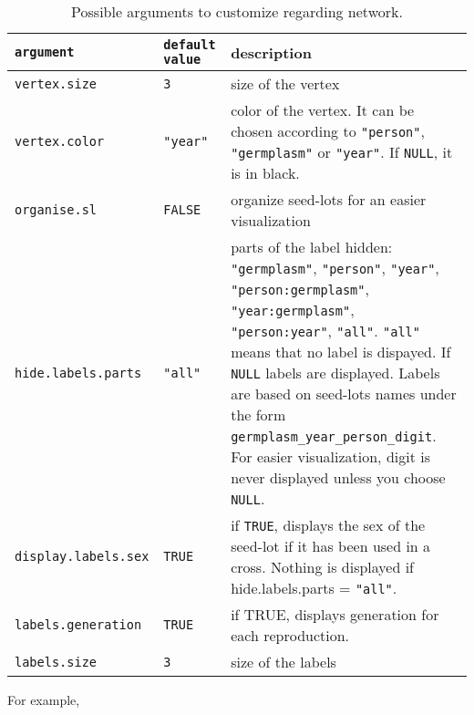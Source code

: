 \documentclass{article}\usepackage[]{graphicx}\usepackage[]{color}
\begin{document}
\begin{center}
\begin{table}[H]
\begin{tabular}{ p{} p{} p{} }
\hline
\texttt{argument} & \texttt{default value} & description \\
\hline

\texttt{vertex.size} & \texttt{3} &  size of the vertex \\

\texttt{vertex.color} & \texttt{"year"} & color of the vertex. 
It can be chosen according to  \texttt{"person"}, \texttt{"germplasm"} or \texttt{"year"}. 
If \texttt{NULL}, it is in black. \\

\texttt{organise.sl} & \texttt{FALSE} & organize seed-lots for an easier visualization \\

\texttt{hide.labels.parts} & \texttt{"all"} & parts of the label hidden: \texttt{"germplasm"}, \texttt{"person"}, \texttt{"year"}, \texttt{"person:germplasm"}, \texttt{"year:germplasm"}, \texttt{"person:year"}, \texttt{"all"}. 
\texttt{"all"} means that no label is dispayed. 
If \texttt{NULL} labels are displayed. Labels are based on seed-lots names under the form \texttt{germplasm\_year\_person\_digit}.
For easier visualization, digit is never displayed unless you choose \texttt{NULL}.
\\

\texttt{display.labels.sex} & \texttt{TRUE} & if \texttt{TRUE}, displays the sex of the seed-lot if it has been used in a cross. Nothing is displayed if hide.labels.parts = \texttt{"all"}. \\

\texttt{labels.generation} & \texttt{TRUE} & if TRUE, displays generation for each reproduction. \\

\texttt{labels.size} & \texttt{3} & size of the labels \\
\hline
\end{tabular}
\caption{Possible arguments to customize regarding network.}
\label{custom.network}
\end{table}
\end{center}


For example,
\end{document}
